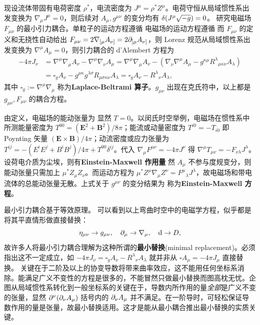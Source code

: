 现设流体带固有电荷密度 $\rho^*$，电流密度为 $J^\mu=\rho^* Z^\mu$。电荷守恒从局域惯性系出发变换为 $\nabla_\mu J^\mu = 0$，则后续对 $A_\mu,g^{\mu\nu}$ 的变分均有 $\var(J^\mu\sqrt{-g})=0$。
研究电磁场 $F_{\mu\nu}$ 的最小引力耦合。单粒子的运动方程遵循
电磁场的运动方程遵循
而 $F_{\mu\nu}$ 的定义和无挠性自动给出 $F_{\mu\nu}=2\nabla_{[\mu}A_{\nu]}=2\partial_{[\mu}A_{\nu]}$，则
Lorenz 规范从局域惯性系出发变换为 $\nabla^\mu A_\mu =0$，则引力耦合的 d'Alembert 方程为
\begin{align}
    -4\pi J_\nu&=\nabla^\mu\nabla_\mu A_\nu- \nabla^\mu \nabla_\nu A_\mu = \nabla^\mu\nabla_\mu A_\nu- (\nabla_\nu\nabla^\mu A_\mu -g^{\kappa\mu} R^\lambda{}_{\mu\kappa\nu} A_\lambda)\nonumber\\
    &=\square_g A_\nu-g^{\mu\kappa} g^{\lambda\sigma} R_{\mu\sigma\kappa\nu} A_\lambda=\square_g A_\nu- R^\lambda{}_{\nu} A_\lambda,
\end{align}
其中 $\square_g:=\nabla^\mu\nabla_\mu$ 称为\textbf{Laplace-Beltrami 算子}。$g_{\mu\nu}$ 出现在克氏符中，以上都是$g_{\mu\nu},F_{\mu\nu}$ 的耦合方程。

由定义，电磁场的能动张量为
显然 $T=0$。以闵氏时空举例，电磁场在惯性系中所测能量密度为 $T^{00}=(\bm E^2+\bm B^2)/8\pi$；能流或动量密度为 $T^{i0}=-T_{i0}$ 即 Poynting 矢量 $(\bm E\times \bm B) / 4\pi$；动流密度或应力张量为 $T^{ij}=-(E^i E^j+B^i B^j)/4\pi+T^{00}\delta^{ij}$。代入 $\nabla_\mu F^{\mu\nu}=-4 \pi J^\nu$ 得
$\nabla^\mu T_{\mu\nu}=-F_{\nu\lambda}J^\lambda$。
设荷电介质为尘埃，则有\textbf{Einstein-Maxwell 作用量}
然 $A_\mu$ 不参与度规变分，则能动张量只需加上 $\mu^* Z_\mu Z_\nu$。而运动方程为 $\mu^* Z^\mu\nabla_\mu Z^\nu=F^\mu{}_{\lambda}J^\lambda$，故电磁场和带电流体的总能动张量无散。上式关于 $g^{\mu\nu}$ 的变分结果为
称为\textbf{Einstein-Maxwell 方程}。

最小引力耦合基于等效原理。
可以看到以上弯曲时空中的电磁学方程，似乎都是将其平直情形做直接替换：
\[
    \eta_{\mu\nu}\to g_{\mu\nu},\quad\partial_\mu\to\nabla_\mu,\quad\dd\to D,
\]
故许多人将最小引力耦合理解为这种所谓的\textbf{最小替换}(minimal replacement)。必须指出这不一定成立，如 $-4\pi J_\nu=\square_g A_\nu- R^\lambda{}_{\nu} A_\lambda$ 就并非从 $\square A_\mu =-4\pi J_\mu$ 直接替换。
关键在于二阶及以上的协变导数将带来曲率效应，这不能用任何坐标系消除。能满足广义不变性的方程是很多的，不能冒然只做最小替换而图高枕无忧。企图从局域惯性系转化到一般坐标系的关键在于，导数内所作用的量\textit{全部}是广义不变的张量，显然 $\partial^\nu(\partial_\nu A_\mu)$ 括号内的 $\partial_\nu A_\mu$ 并不满足。在一阶导时，可轻松保证导数作用的量是张量，故最小替换适用。这才是能从最小耦合推出最小替换的实质关键。

